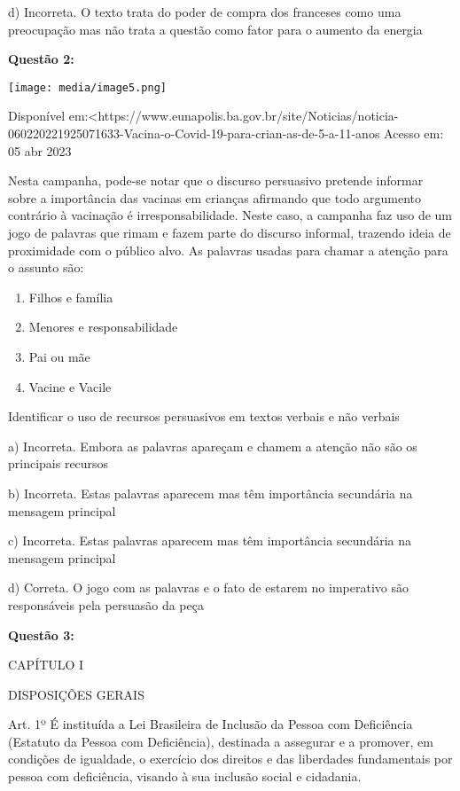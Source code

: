d) Incorreta. O texto trata do poder de compra dos franceses como uma
preocupação mas não trata a questão como fator para o aumento da energia

\textbf{Questão 2:}

\texttt{[image: media/image5.png]}

Disponível
em:\textless https://www.eunapolis.ba.gov.br/site/Noticias/noticia-060220221925071633-Vacina-o-Covid-19-para-crian-as-de-5-a-11-anos
Acesso em: 05 abr 2023

Nesta campanha, pode-se notar que o discurso persuasivo pretende
informar sobre a importância das vacinas em crianças afirmando que todo
argumento contrário à vacinação é irresponsabilidade. Neste caso, a
campanha faz uso de um jogo de palavras que rimam e fazem parte do
discurso informal, trazendo ideia de proximidade com o público alvo. As
palavras usadas para chamar a atenção para o assunto são:

\begin{enumerate}
\def\labelenumi{\alph{enumi})}
\item
  Filhos e família
\item
  Menores e responsabilidade
\item
  Pai ou mãe
\item
  Vacine e Vacile
\end{enumerate}

Identificar o uso de recursos persuasivos em textos verbais e não
verbais

a) Incorreta. Embora as palavras apareçam e chamem a atenção não são os
principais recursos

b) Incorreta. Estas palavras aparecem mas têm importância secundária na
mensagem principal

c) Incorreta. Estas palavras aparecem mas têm importância secundária na
mensagem principal

d) Correta. O jogo com as palavras e o fato de estarem no imperativo são
responsáveis pela persuasão da peça

\textbf{Questão 3:}

CAPÍTULO I

DISPOSIÇÕES GERAIS

Art. 1º É instituída a Lei Brasileira de Inclusão da Pessoa com
Deficiência (Estatuto da Pessoa com Deficiência), destinada a assegurar
e a promover, em condições de igualdade, o exercício dos direitos e das
liberdades fundamentais por pessoa com deficiência, visando à sua
inclusão social e cidadania.

